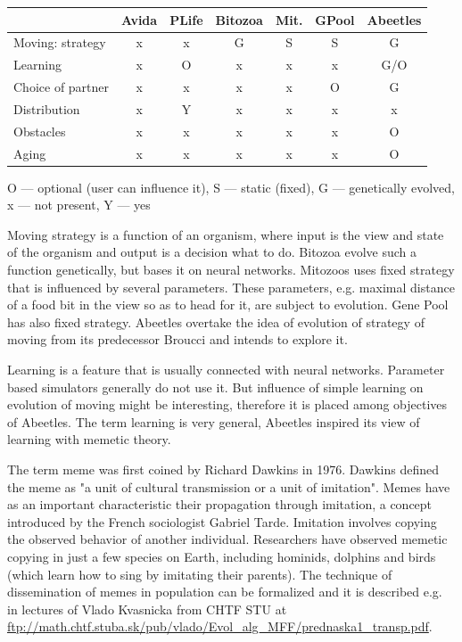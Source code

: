 \documentclass[a4paper,12pt]{report}
\begin{document}
\vspace{10pt} 
\begin{tabular}{lcccccc}
 & Avida & PLife&  Bitozoa& Mit.& GPool & Abeetles\\ \hline
Moving: strategy&x&x&G&S&S&G\\
Learning&x&O&x&x&x&G/O\\
Choice of partner&x&x&x&x&O&G\\
Distribution&x&Y&x&x&x&x\\
Obstacles&x&x&x&x&x&O\\
Aging&x&x&x&x&x&O\\
\end{tabular}
\vspace{10pt}

O --- optional (user can influence it), S --- static (fixed), G --- genetically evolved, x --- not present, Y --- yes

\vspace{10pt}

Moving strategy is a function of an organism, where input is the view and state of the organism and output is a decision what to do. Bitozoa evolve such a function genetically, but bases it on neural networks. Mitozoos uses fixed strategy that is influenced by several parameters. These parameters, e.g. maximal distance of a food bit in the view so as to head for it, are subject to evolution. Gene Pool has also fixed strategy. Abeetles overtake the idea of evolution of strategy of moving from its predecessor Broucci and intends to explore it.

Learning is a feature that is usually connected with neural networks. Parameter based simulators generally do not use it. But influence of simple learning on evolution of moving might be interesting, therefore it is placed among objectives of Abeetles. The term learning is very general, Abeetles inspired its view of learning with memetic theory. 

The term meme was first coined by Richard Dawkins in 1976. Dawkins defined the meme as "a unit of cultural transmission or a unit of imitation"\cite{SelfishGene}. Memes have as an important characteristic their propagation through imitation, a concept introduced by the French sociologist Gabriel Tarde. Imitation involves copying the observed behavior of another individual. Researchers have observed memetic copying in just a few species on Earth, including hominids, dolphins and birds (which learn how to sing by imitating their parents). The technique of dissemination of memes in population can be formalized and it is described e.g. in lectures of Vlado Kvasnicka from CHTF STU at \url{ftp://math.chtf.stuba.sk/pub/vlado/Evol_alg_MFF/prednaska1_transp.pdf}.
\end{document}
